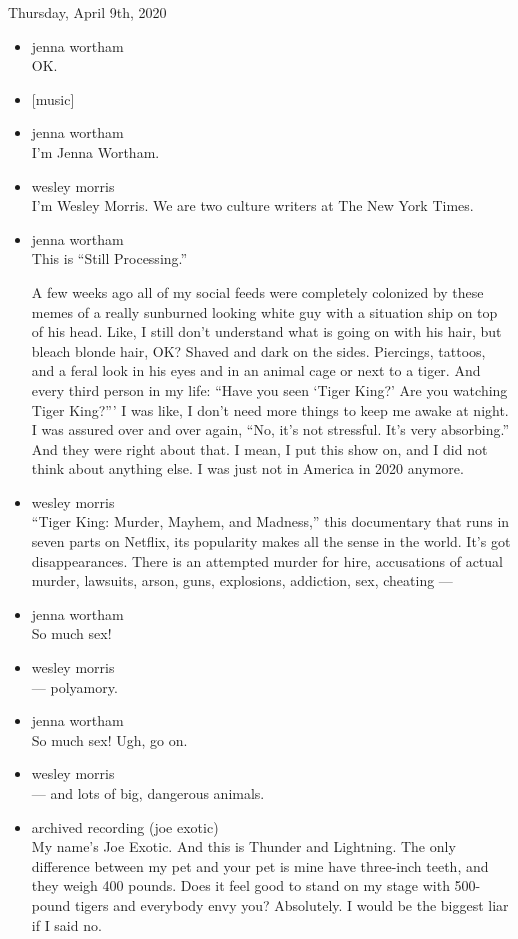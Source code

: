 Thursday, April 9th, 2020

\begin{itemize}
\item
  jenna wortham\\
  OK.
\item
  {[}music{]}
\item
  jenna wortham\\
  I'm Jenna Wortham.
\item
  wesley morris\\
  I'm Wesley Morris. We are two culture writers at The New York Times.
\item
  jenna wortham\\
  This is ``Still Processing.''

  A few weeks ago all of my social feeds were completely colonized by
  these memes of a really sunburned looking white guy with a situation
  ship on top of his head. Like, I still don't understand what is going
  on with his hair, but bleach blonde hair, OK? Shaved and dark on the
  sides. Piercings, tattoos, and a feral look in his eyes and in an
  animal cage or next to a tiger. And every third person in my life:
  ``Have you seen `Tiger King?' Are you watching Tiger King?''' I was
  like, I don't need more things to keep me awake at night. I was
  assured over and over again, ``No, it's not stressful. It's very
  absorbing.'' And they were right about that. I mean, I put this show
  on, and I did not think about anything else. I was just not in America
  in 2020 anymore.
\item
  wesley morris\\
  ``Tiger King: Murder, Mayhem, and Madness,'' this documentary that
  runs in seven parts on Netflix, its popularity makes all the sense in
  the world. It's got disappearances. There is an attempted murder for
  hire, accusations of actual murder, lawsuits, arson, guns, explosions,
  addiction, sex, cheating ---
\item
  jenna wortham\\
  So much sex!
\item
  wesley morris\\
  --- polyamory.
\item
  jenna wortham\\
  So much sex! Ugh, go on.
\item
  wesley morris\\
  --- and lots of big, dangerous animals.
\item
  archived recording (joe exotic)\\
  My name's Joe Exotic. And this is Thunder and Lightning. The only
  difference between my pet and your pet is mine have three-inch teeth,
  and they weigh 400 pounds. Does it feel good to stand on my stage with
  500-pound tigers and everybody envy you? Absolutely. I would be the
  biggest liar if I said no.
\end{itemize}

